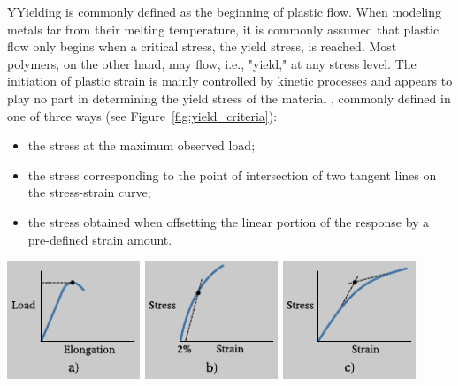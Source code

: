 \enlargethispage{\baselineskip}
\begin{remark}
YYielding is commonly defined as the beginning of plastic flow.
When modeling metals far from their melting temperature, it is commonly assumed that plastic flow only begins when a critical stress, the yield stress, is reached.
Most polymers, on the other hand, may flow, i.e., "yield," at any stress level.
The initiation of plastic strain is mainly controlled by kinetic processes and appears to play no part in determining the yield stress of the material \citep{fotheringhamRoleRecoveryForces1978}, commonly defined in one of three ways \citep{wardReviewYieldBehaviour1971} (see Figure~\ref{fig:yield_criteria}):
    \begin{itemize}
        \item the stress at the maximum observed load;
        \item the stress corresponding to the point of intersection of two tangent lines on the stress-strain curve;
        \item the stress obtained when offsetting the linear portion of the response by a pre-defined strain amount.
    \end{itemize}
    \begin{center}
            \centering
                                \includegraphics[width=0.3\textwidth]{figures/yield_criterion_a}
                \hfill
                            \includegraphics[width=0.3\textwidth]{figures/yield_criterion_b}
            \hfill
                                \includegraphics[width=0.3\textwidth]{figures/yield_criterion_c}
        \label{fig:yield_criteria}
    \end{center}
\label{rmrk:yield_polymer}
\end{remark}


